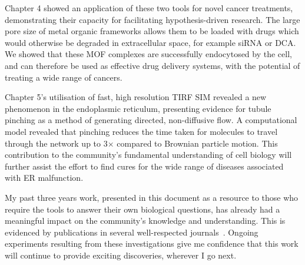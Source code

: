 Chapter 4 showed an application of these two tools for novel cancer treatments, demonstrating their capacity for facilitating hypothesis-driven research. 
The large pore size of metal organic frameworks allows them to be loaded with drugs which would otherwise be degraded in extracellular space, for example siRNA or DCA. 
We showed that these MOF complexes are successfully endocytosed by the cell, and can therefore be used as effective drug delivery systems, with the potential of treating a wide range of cancers. 

Chapter 5's utilisation of fast, high resolution TIRF SIM revealed a new phenomenon in the endoplasmic reticulum, presenting evidence for tubule pinching as a method of generating directed, non-diffusive flow. 
A computational model revealed that pinching reduces the time taken for molecules to travel through the network up to 3$\times$ compared to Brownian particle motion. 
This contribution to the community's fundamental understanding of cell biology will further assist the effort to find cures for the wide range of diseases associated with ER malfunction.

My past three years work, presented in this document as a resource to those who require the tools to answer their own biological questions, has already had a meaningful impact on the community's knowledge and understanding.
This is evidenced by publications in several well-respected journals~\cite{teplensky2017temperature, fantham2017new, moghadam2018computer, holcman2018single, lautenschlager2018c}. 
Ongoing experiments resulting from these investigations give me confidence that this work will continue to provide exciting discoveries, wherever I go next. 

%

